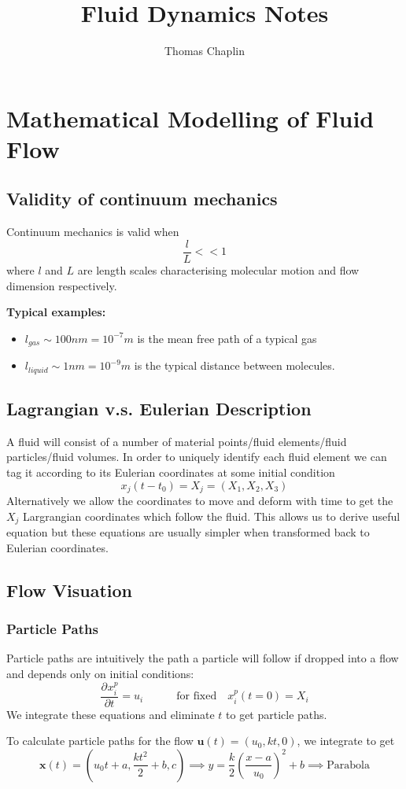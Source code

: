 \documentclass[11pt]{article}
\title{Fluid Dynamics Notes}
\author{Thomas Chaplin}
\date{}
\newcommand*{\pd}[3][]{\ensuremath{\frac{\partial^{#1} {#2}}{\partial {#3}^{#1}}}}
\newcommand{\mv}[1]{\textbf{#1}}
\newenvironment{eg}
    {\begin{mdframed}[backgroundcolor=mylg, roundcorner=5pt, linewidth=0pt]}
    {\end{mdframed}}
\begin{document}
\maketitle
\section{Mathematical Modelling of Fluid Flow}
\subsection{Validity of continuum mechanics}
Continuum mechanics is valid when
$$\frac{l}{L}<<1$$
where $l$ and $L$ are length scales characterising molecular motion and flow dimension respectively.
\begin{eg}
\textbf{Typical examples:}
\begin{itemize}
    \item $l_{gas}\sim 100nm=10^{-7}m$ is the mean free path of a typical gas
    \item $l_{liquid}\sim 1nm=10^{-9}m$ is the typical distance between molecules.
\end{itemize}
\end{eg}

\subsection{Lagrangian v.s. Eulerian Description}
A fluid will consist of a number of material points/fluid elements/fluid particles/fluid volumes.
In order to uniquely identify each fluid element we can tag it according to its Eulerian coordinates at some initial condition
$$x_j(t-t_0)=X_j=(X_1,X_2,X_3)$$
Alternatively we allow the coordinates to move and deform with time to get the $X_j$ Largrangian coordinates which follow the fluid.
This allows us to derive useful equation but these equations are usually simpler when transformed back to Eulerian coordinates.

\subsection{Flow Visuation}
\subsubsection{Particle Paths}
Particle paths are intuitively the path a particle will follow if dropped into a flow and depends only on initial conditions:
$$\pd{x_i^p}{t}=u_i \quad\quad\quad \text{for fixed} \quad x_i^p(t=0)=X_i$$
We integrate these equations and eliminate $t$ to get particle paths.
\begin{eg}
To calculate particle paths for the flow $\mv{u}(t)=(u_0,kt,0)$, we integrate to get
$$\mv{x}(t)=(u_0t+a,\frac{kt^2}{2}+b,c)\implies y=\frac{k}{2}\left(\frac{x-a}{u_0}\right)^2+b\implies\text{Parabola}$$
\end{eg}
\end{document}
